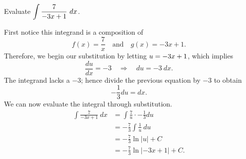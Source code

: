 \begin{example} \label{Ex:4.6.usub2}
Evaluate $\displaystyle \int \frac{7}{-3x+1}\ dx$.

\solution
First notice this integrand is a composition of 
\[ f(x) = \frac{7}{x} \quad \mbox{and} \quad g(x) = -3x+1. \]
Therefore, we begin our substitution by letting $\displaystyle u = -3x+1$, which implies
\[ \frac{du}{dx} = -3 \quad \Rightarrow \quad du = -3 \ dx. \]
The integrand lacks a $-3$; hence divide the previous equation by $-3$ to obtain 
\[ - \frac{1}{3} du = dx.\]
We can now evaluate the integral through substitution.
\begin{align*}
\int \frac{7}{-3x+1}\ dx & = \int \frac{7}{u} \cdot -\frac{1}{3} du \\
&= -\frac{7}{3} \int \frac{1}{u} \ du \\
&= -\frac{7}{3} \ln |u| + C\\
&= -\frac{7}{3} \ln|-3x+1| + C.
\end{align*}
\end{example}